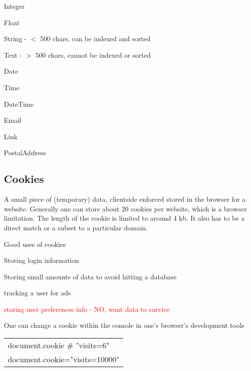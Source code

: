\documentclass[12pt]{article}
\begin{document}
\begin{list}{*}{
\setlength{\itemsep}{0pt}
\setlength{\parsep}{0pt}
\setlength{\topsep}{0pt}
\setlength{\partopsep}{0pt}
\setlength{\leftmargin}{2em}
\setlength{\labelwidth}{1.5em}
\setlength{\labelsep}{0.5em}
}
\item Integer
\item Float
\item String - $<$ 500 chars, can be indexed and sorted
\item Text - $>$ 500 chars, cannot be indexed or sorted
\item Date
\item Time
\item DateTime
\item Email
\item Link
\item PostalAddress
\end{list}



\subsection{Cookies}

A small piece of (temporary) data, clientside enforced stored in the browser for a website. Generally one can store about 20 cookies per website, which is a browser limitation. The length of the cookie is limited to around 4 kb. It also has to be a direct match or a subset to a particular domain.

Good uses of cookies
\begin{list}{*}{
\setlength{\itemsep}{0pt}
\setlength{\parsep}{0pt}
\setlength{\topsep}{0pt}
\setlength{\partopsep}{0pt}
\setlength{\leftmargin}{2em}
\setlength{\labelwidth}{1.5em}
\setlength{\labelsep}{0.5em}
}
\item Storing login information
\item Storing small amounts of data to avoid hitting a database
\item tracking a user for ads
\item \textcolor{red}{storing user preferences info - NO, want data to survice}
\end{list}

One can change a cookie within the console in one's browser's development tools

\begin{tabular}{l}
document.cookie $\#$ "visits=6" \\
document.cookie="visits=10000"
\end{tabular}
\end{document}
